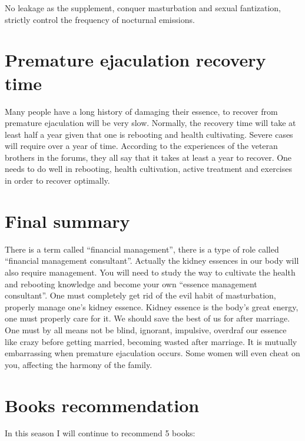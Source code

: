 \documentclass[
]{book}
\begin{document}
No leakage as the supplement, conquer masturbation and sexual fantization, strictly control the frequency of nocturnal emissions.

\hypertarget{premature-ejaculation-recovery-time}{%
\section{Premature ejaculation recovery time}\label{premature-ejaculation-recovery-time}}

Many people have a long history of damaging their essence, to recover from premature ejaculation will be very slow. Normally, the recovery time will take at least half a year given that one is rebooting and health cultivating. Severe cases will require over a year of time. According to the experiences of the veteran brothers in the forums, they all say that it takes at least a year to recover. One needs to do well in rebooting, health cultivation, active treatment and exercises in order to recover optimally.

\hypertarget{final-summary-1}{%
\section{Final summary}\label{final-summary-1}}

There is a term called ``financial management'', there is a type of role called ``financial management consultant''. Actually the kidney essences in our body will also require management. You will need to study the way to cultivate the health and rebooting knowledge and become your own ``essence management consultant''. One must completely get rid of the evil habit of masturbation, properly manage one's kidney essence. Kidney essence is the body's great energy, one must properly care for it. We should save the best of us for after marriage. One must by all means not be blind, ignorant, impulsive, overdraf our essence like crazy before getting married, becoming wasted after marriage. It is mutually embarrassing when premature ejaculation occurs. Some women will even cheat on you, affecting the harmony of the family.

\hypertarget{books-recommendation-3}{%
\section{Books recommendation}\label{books-recommendation-3}}

In this season I will continue to recommend 5 books:
\end{document}
